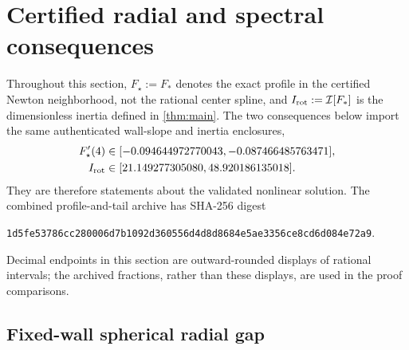 \section{Certified radial and spectral consequences}
\label{sec:consequences}

Throughout this section, $F_\star:=F_*$ denotes the exact profile in the
certified Newton neighborhood, not the rational center spline, and
$I_{\rm rot}:=\mathcal I[F_*]$ is the dimensionless inertia defined in
\cref{thm:main}.  The two consequences below import the same authenticated
wall-slope and inertia enclosures,
\begin{align}
 F_\star'(4)&\in[-0.094644972770043,-0.087466485763471],\notag\\
 I_{\rm rot}&\in[21.149277305080,48.920186135018].
 \label{eq:consequence-profile-inputs}
\end{align}
They are therefore statements about the validated nonlinear solution.  The
combined profile-and-tail archive has SHA-256 digest
\begin{center}
\small\nolinkurl{1d5fe53786cc280006d7b1092d360556d4d8d8684e5ae3356ce8cd6d084e72a9}.
\end{center}
Decimal endpoints in this section are outward-rounded displays of rational
intervals; the archived fractions, rather than these displays, are used in the
proof comparisons.

\subsection{Fixed-wall spherical radial gap}
\label{sec:fixed-wall-gap}

